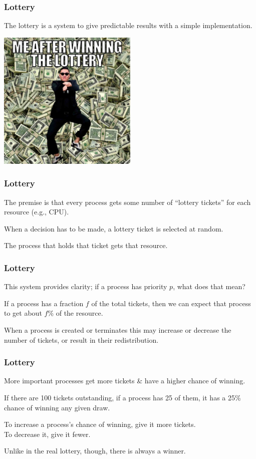 \begin{frame}
\frametitle{Lottery}

The lottery is a system to give predictable results with a simple implementation. 

\begin{center}
	\includegraphics[width=0.5\textwidth]{images/lottery.jpg}
\end{center}

\end{frame}

\begin{frame}
\frametitle{Lottery}

The premise is that every process gets some number of ``lottery tickets'' for each resource (e.g., CPU). 

When a decision has to be made, a lottery ticket is selected at random. 

The process that holds that ticket gets that resource.

\end{frame}

\begin{frame}
\frametitle{Lottery}

This system provides clarity; if a process has priority $p$, what does that mean? 

If a process has a fraction $f$ of the total tickets, then we can expect that process to get about $f$\% of the resource. 

When a process is created or terminates this may increase or decrease the number of tickets, or result in their redistribution.


\end{frame}

\begin{frame}
\frametitle{Lottery}

More important processes get more tickets \& have a higher chance of winning. 

If there are 100 tickets outstanding, if a process has 25 of them, it has a 25\% chance of winning any given draw. 

To increase a process's chance of winning, give it more tickets.\\
\quad To decrease it, give it fewer. 

Unlike in the real lottery, though, there is always a winner.

\end{frame}

